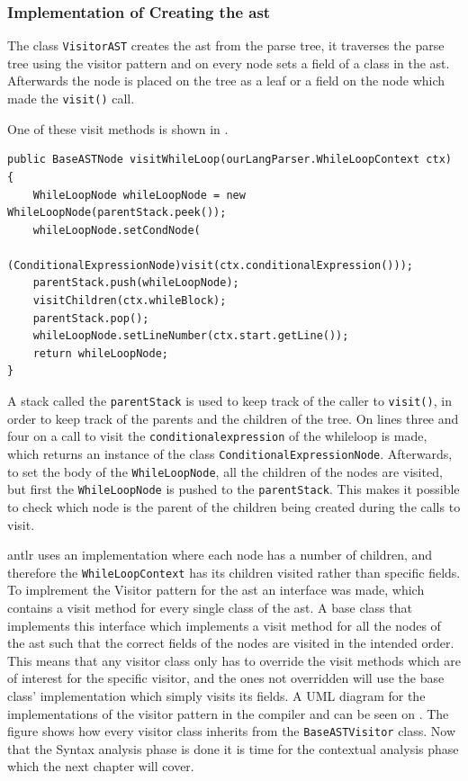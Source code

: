 \subsubsection*{Implementation of Creating the \acrshort{ast}}

The class \texttt{VisitorAST} creates the \acrshort{ast} from the parse tree, it traverses the parse tree using the visitor pattern and on every node sets a field of a class in the \acrshort{ast}. 
Afterwards the node is placed on the tree as a leaf or a field on the node which made the \texttt{visit()} call.

One of these visit methods is shown in .

\begin{lstlisting}[caption=The visit method for WhileLoopNode.,frame=tlrb,label={lst:VisitorASTCode}]
public BaseASTNode visitWhileLoop(ourLangParser.WhileLoopContext ctx) {
    WhileLoopNode whileLoopNode = new WhileLoopNode(parentStack.peek());
    whileLoopNode.setCondNode(
    	(ConditionalExpressionNode)visit(ctx.conditionalExpression()));
    parentStack.push(whileLoopNode);
    visitChildren(ctx.whileBlock);
    parentStack.pop();
    whileLoopNode.setLineNumber(ctx.start.getLine());
    return whileLoopNode;
}
\end{lstlisting}
A stack called the \texttt{parentStack} is used to keep track of the caller to \texttt{visit()}, in order to keep track of the parents and the children of the tree.
On lines three and four on  a call to visit the \texttt{conditionalexpression} of the whileloop is made, which returns an instance of the class \texttt{ConditionalExpressionNode}.
Afterwards, to set the body of the \texttt{WhileLoopNode}, all the children of the nodes are visited, but first the \texttt{WhileLoopNode} is pushed to the \texttt{parentStack}.
This makes it possible to check which node is the parent of the children being created during the calls to visit.

\acrshort{antlr} uses an implementation where each node has a number of children, and therefore the \texttt{WhileLoopContext} has its children visited rather than specific fields.
To implrement the Visitor pattern for the \acrshort{ast} an interface was made, which contains a visit method for every single class of the \acrshort{ast}.
A base class that implements this interface which implements a visit method for all the nodes of the \acrshort{ast} such that the correct fields of the nodes are visited in the intended order.
This means that any visitor class only has to override the visit methods which are of interest for the specific visitor, and the ones not overridden will use the base class' implementation which simply visits its fields.
A UML diagram for the implementations of the visitor pattern in the compiler and can be seen on .
The figure shows how every visitor class inherits from the \texttt{BaseASTVisitor} class.
Now that the Syntax analysis phase is done it is time for the contextual analysis phase which the next chapter will cover. 

